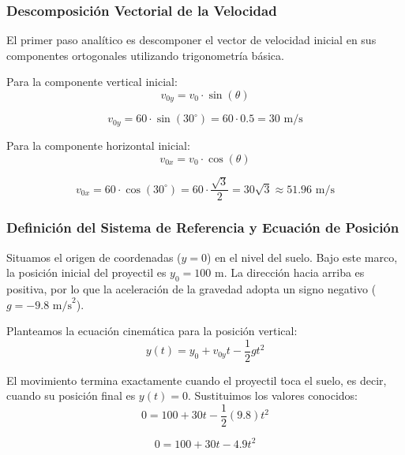 \documentclass[12pt, a4paper]{article}
\begin{document}
\subsubsection*{Descomposición Vectorial de la Velocidad}

El primer paso analítico es descomponer el vector de velocidad inicial en sus componentes ortogonales utilizando trigonometría básica.

Para la componente vertical inicial:
\begin{equation}
v_{0y} = v_0 \cdot \sin(\theta)
\end{equation}

\begin{equation}
v_{0y} = 60 \cdot \sin(30^\circ) = 60 \cdot 0.5 = 30 \text{ m/s}
\end{equation}

Para la componente horizontal inicial:
\begin{equation}
v_{0x} = v_0 \cdot \cos(\theta)
\end{equation}

\begin{equation}
v_{0x} = 60 \cdot \cos(30^\circ) = 60 \cdot \frac{\sqrt{3}}{2} = 30\sqrt{3} \approx 51.96 \text{ m/s}
\end{equation}

\subsubsection*{Definición del Sistema de Referencia y Ecuación de Posición}

Situamos el origen de coordenadas ($y = 0$) en el nivel del suelo. Bajo este marco, la posición inicial del proyectil es $y_0 = 100 \text{ m}$. La dirección hacia arriba es positiva, por lo que la aceleración de la gravedad adopta un signo negativo ($g = -9.8 \text{ m/s}^2$).

Planteamos la ecuación cinemática para la posición vertical:
\begin{equation}
y(t) = y_0 + v_{0y}t - \frac{1}{2}gt^2
\end{equation}

El movimiento termina exactamente cuando el proyectil toca el suelo, es decir, cuando su posición final es $y(t) = 0$. Sustituimos los valores conocidos:
\begin{equation}
0 = 100 + 30t - \frac{1}{2}(9.8)t^2
\end{equation}

\begin{equation}
0 = 100 + 30t - 4.9t^2
\end{equation}
\end{document}
